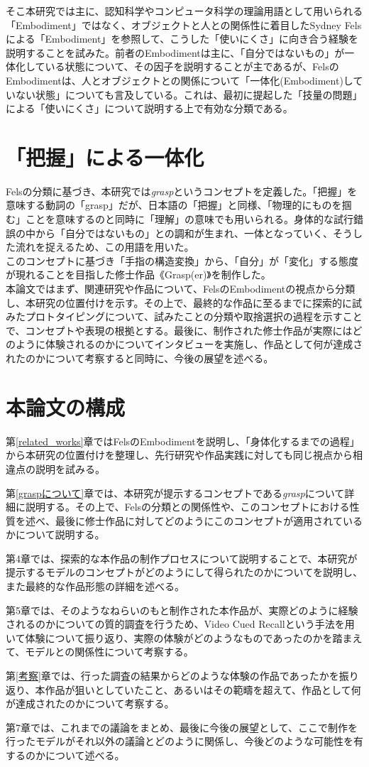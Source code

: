そこ本研究では主に、認知科学やコンピュータ科学の理論用語として用いられる「Embodiment」ではなく、オブジェクトと人との関係性に着目したSydney Felsによる「Embodiment」を参照して、こうした「使いにくさ」に向き合う経験を説明することを試みた。前者のEmbodimentは主に、「自分ではないもの」が一体化している状態について、その因子を説明することが主であるが、FelsのEmbodimentは、人とオブジェクトとの関係について「一体化(Embodiment)していない状態」についても言及している。これは、最初に提起した「技量の問題」による「使いにくさ」について説明する上で有効な分類である。

\section*{「把握」による一体化}
Felsの分類に基づき、本研究では\textit{grasp}というコンセプトを定義した。「把握」を意味する動詞の「grasp」だが、日本語の「把握」と同様、「物理的にものを掴む」ことを意味するのと同時に「理解」の意味でも用いられる。身体的な試行錯誤の中から「自分ではないもの」との調和が生まれ、一体となっていく、そうした流れを捉えるため、この用語を用いた。\\
このコンセプトに基づき「手指の構造変換」から、「自分」が「変化」する態度が現れることを目指した修士作品《Grasp(er)》を制作した。\\
本論文ではまず、関連研究や作品について、FelsのEmbodimentの視点から分類し、本研究の位置付けを示す。その上で、最終的な作品に至るまでに探索的に試みたプロトタイピングについて、試みたことの分類や取捨選択の過程を示すことで、コンセプトや表現の根拠とする。最後に、制作された修士作品が実際にはどのように体験されるのかについてインタビューを実施し、作品として何が達成されたのかについて考察すると同時に、今後の展望を述べる。

\section{本論文の構成}
第\ref{related_works}章ではFelsのEmbodimentを説明し、「身体化するまでの過程」から本研究の位置付けを整理し、先行研究や作品実践に対しても同じ視点から相違点の説明を試みる。

第\ref{graspについて}章では、本研究が提示するコンセプトである\textit{grasp}について詳細に説明する。その上で、Felsの分類との関係性や、このコンセプトにおける性質を述べ、最後に修士作品に対してどのようにこのコンセプトが適用されているかについて説明する。

第4章では、探索的な本作品の制作プロセスについて説明することで、本研究が提示するモデルのコンセプトがどのようにして得られたのかについてを説明し、また最終的な作品形態の詳細を述べる。

第5章では、そのようなねらいのもと制作された本作品が、実際どのように経験されるのかについての質的調査を行うため、Video Cued Recallという手法を用いて体験について振り返り、実際の体験がどのようなものであったのかを踏まえて、モデルとの関係性について考察する。

第\ref{考察}章では、行った調査の結果からどのような体験の作品であったかを振り返り、本作品が狙いとしていたこと、あるいはその範疇を超えて、作品として何が達成されたのかについて考察する。

第7章では、これまでの議論をまとめ、最後に今後の展望として、ここで制作を行ったモデルがそれ以外の議論とどのように関係し、今後どのような可能性を有するのかについて述べる。